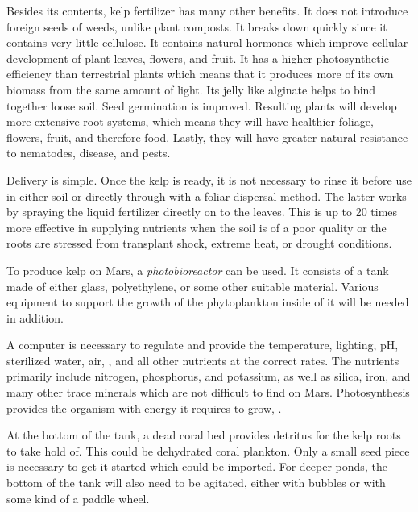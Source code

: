Besides its contents, kelp fertilizer has many other benefits. It does not introduce foreign seeds of weeds, unlike plant composts. It breaks down quickly since it contains very little cellulose. It contains natural hormones which improve cellular development of plant leaves, flowers, and fruit. It has a higher photosynthetic efficiency than terrestrial plants which means that it produces more of its own biomass from the same amount of light. Its jelly like alginate helps to bind together loose soil. Seed germination is improved. Resulting plants will develop more extensive root systems, which means they will have healthier foliage, flowers, fruit, and therefore food. Lastly, they will have greater natural resistance to nematodes, disease, and pests.

Delivery is simple. Once the kelp is ready, it is not necessary to rinse it before use in either soil or directly through with a foliar dispersal method. The latter works by spraying the liquid fertilizer directly on to the leaves. This is up to 20 times more effective in supplying nutrients when the soil is of a poor quality or the roots are stressed from transplant shock, extreme heat, or drought conditions.

To produce kelp on Mars, a {\it photobioreactor} can be used. It consists of a tank made of either glass, polyethylene, or some other suitable material. Various equipment to support the growth of the phytoplankton inside of it will be needed in addition.

A computer is necessary to regulate and provide the temperature, lighting, pH, sterilized water, air, , and all other nutrients at the correct rates. The nutrients primarily include nitrogen, phosphorus, and potassium, as well as silica, iron, and many other trace minerals which are not difficult to find on Mars. Photosynthesis provides the organism with energy it requires to grow, .

    {}

At the bottom of the tank, a dead coral bed provides detritus for the kelp roots to take hold of. This could be dehydrated coral plankton. Only a small seed piece is necessary to get it started which could be imported. For deeper ponds, the bottom of the tank will also need to be agitated, either with bubbles or with some kind of a paddle wheel.


